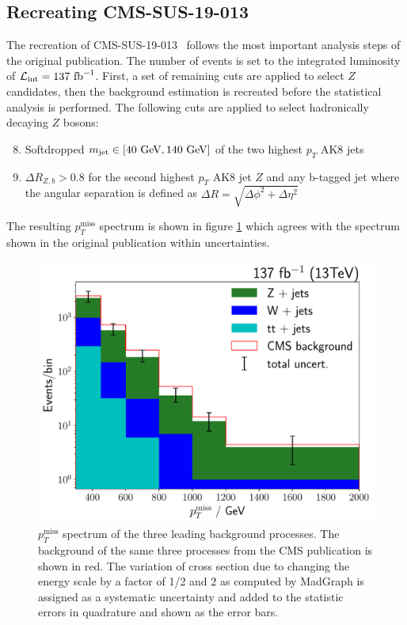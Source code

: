 \documentclass[prd, twocolumn, superscriptaddress,floatfix, nofootinbib, preprintnumbers]{revtex4-2}
\begin{document}
\subsection{Recreating CMS-SUS-19-013}
\label{sec:recreatingCMS}
The recreation of CMS-SUS-19-013~\cite{CMS:2020fia} follows the most important analysis steps of the original publication. The number of events is set to the integrated luminosity of $\mathcal{L}_\text{int}=137~{\rm fb}^{-1}$. First, a set of remaining cuts are applied to select $Z$ candidates, then the background estimation is recreated before the statistical analysis is performed.
The following cuts are applied to select hadronically decaying $Z$ bosons:
\begin{enumerate}
\setcounter{enumi}{7}
\item Softdropped $m_\text{jet}\in [40~{\rm GeV},140~{\rm GeV}]$ of the two highest $p_T$ AK8 jets
\item $\Delta R_{Z,b}>0.8$ for the second highest $p_T$ AK8 jet $Z$ and any b-tagged jet where the angular separation is defined as $\Delta R=\sqrt{\Delta \phi^2+\Delta \eta^2}$
\end{enumerate}
The resulting $p_T^\text{miss}$ spectrum is shown in figure \ref{fig:ptmissCMS} which agrees with the spectrum shown in the original publication within uncertainties.
\begin{figure}[h!]
\centering
\includegraphics[width=0.9\linewidth]{PTMissErr.pdf}
\caption{$p_T^\text{miss}$ spectrum of the three leading background processes. The background of the same three processes from the CMS publication is shown in red. The variation of cross section due to changing the energy scale by a factor of 1/2 and 2 as computed by MadGraph is assigned as a systematic uncertainty and added to the statistic errors in quadrature and shown as the error bars.}
\label{fig:ptmissCMS}
\end{figure}
\end{document}
